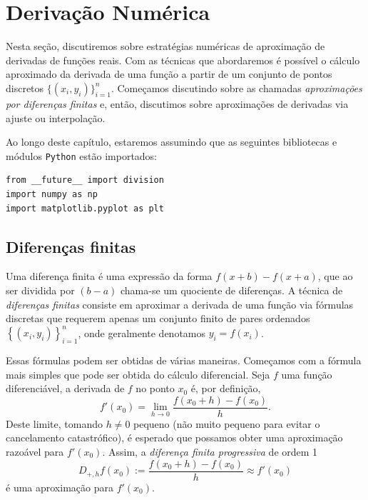 
%

\chapter{Derivação Numérica}

Nesta seção, discutiremos sobre estratégias numéricas de aproximação de derivadas de funções reais. Com as técnicas que abordaremos é possível o cálculo aproximado da derivada de uma função a partir de um conjunto de pontos discretos $\{(x_i, y_i)\}_{i=1}^n$. Começamos discutindo sobre as chamadas \emph{aproximações por diferenças finitas} e, então, discutimos sobre aproximações de derivadas via ajuste ou interpolação.

\ifispython
Ao longo deste capítulo, estaremos assumindo que as seguintes bibliotecas e módulos \verb+Python+ estão importados:
\begin{verbatim}
from __future__ import division
import numpy as np
import matplotlib.pyplot as plt
\end{verbatim}
\fi

\section{Diferenças finitas}

Uma diferença finita é uma expressão da forma $f(x+b)-f(x+a)$, que ao ser dividida por $(b-a)$ chama-se um quociente de diferenças. A técnica de \emph{diferenças finitas} consiste em aproximar a derivada de uma função via fórmulas discretas que requerem apenas um conjunto finito de pares ordenados $\left\{\left(x_i, y_i\right)\right\}_{i=1}^n$, onde geralmente denotamos $y_i=f(x_i)$.

Essas fórmulas podem ser obtidas de várias maneiras. Começamos com a fórmula mais simples que pode ser obtida do cálculo diferencial. Seja $f$ uma função diferenciável, a derivada de $f$ no ponto $x_0$ é, por definição,
\begin{equation*}
  f'(x_0)=\lim_{h\to 0}\frac{f(x_0+h)-f(x_0)}{h}.
\end{equation*}
Deste limite, tomando $h\neq 0$ pequeno (não muito pequeno para evitar o cancelamento catastrófico), é esperado que possamos obter uma aproximação razoável para $f'(x_0)$. Assim, a \emph{diferença finita progressiva} de ordem 1
\begin{equation}\label{eq:dp}
  D_{+,h}f(x_0) := \frac{f(x_0+h)-f(x_0)}{h} \approx f'(x_0)
\end{equation}
é uma aproximação para $f'(x_0)$.

